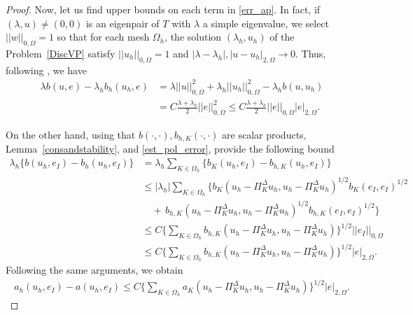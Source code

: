 \documentclass[final,reqno]{elsarticle}
\def\O{\Omega}
\def\PiK{\Pi_{K}^{\Delta}}
\begin{document}
\begin{proof}
Now, let us find upper bounds on each term in \eqref{err_ap}. In fact, if $(\lambda,u)\neq (0,0)$ is an eigenpair of $T$ with $\lambda$ a simple eigenvalue, we select $|| w||_{0,\O}=1$ so that for each mesh $\Omega_h$, the solution $(\lambda_h,u_h)$ of the Problem~\ref{DiscVP} satisfy $||u_h ||_{0,\O}=1$ and $|\lambda-\lambda_h|,|u-u_h |_{2,\O}\to0$. Thus, following \cite[Lemma~3.4]{MRR2015}, we have   
\begin{align}
\lambda b(u,e)-\lambda_h b_h( u_h,e)&= \lambda ||u ||_{0,\O}^2 +\lambda_h ||u_h ||_{0,\O}^2-\lambda_h b(u,u_h)\nonumber\\
&=C\frac{\lambda + \lambda_h}{2}|| e||_{0,\O}^2\leq C\frac{\lambda + \lambda_h}{2}|| e||_{0,\O}|e|_{2,\O}.\label{err_ap2}
\end{align}

On the other hand, using that $b(\cdot,\cdot) ,b_{h,K}(\cdot,\cdot)$ are scalar products, Lemma~\ref{consandstability}, and \eqref{est_pol_error}, provide the following bound 
	\begin{align}
		\lambda_h\Big\{b(u_h,e_I)-b_h(u_h,e_I) \Big\}&=\lambda_h\sum\limits_{K\in \Omega_h} \Big\{b_K(u_h,e_I)-b_{h,K}(u_h,e_I) \Big\}\nonumber\\
	&\leq |\lambda_h| \sum\limits_{K\in \Omega_h}\Bigg\{ b_K(u_h-\PiK u_h,u_h-\PiK u_h)^{1/2}b_K(e_I,e_I)^{1/2} \nonumber\\
    &\quad + \, b_{h,K}(u_h-\PiK u_h,u_h-\PiK u_h)^{1/2}b_{h,K}(e_I,e_I)^{1/2}\Bigg\}\nonumber\\
	&\leq  C\Big\{\sum\limits_{K\in \Omega_h} b_{h,K}(u_h-\PiK u_h,u_h-\PiK u_h)\Big\}^{1/2}|| e_I||_{0,\O}\nonumber\\
        &\leq C\Big\{\sum\limits_{K\in \Omega_h} b_{h,K}(u_h-\PiK u_h,u_h-\PiK u_h)\Big\}^{1/2}| e|_{2,\O}.\label{err_ap3}
	\end{align}
Following the same arguments, we obtain
	\begin{align}
		a_h(u_h,e_I)-a(u_h,e_I)\leq C\Big\{\sum\limits_{K\in \Omega_h} a_K(u_h-\PiK u_h,u_h-\PiK u_h)\Big\}^{1/2}| e|_{2,\O}.\label{err_ap4}
	\end{align}
	

\end{proof}
\end{document}
